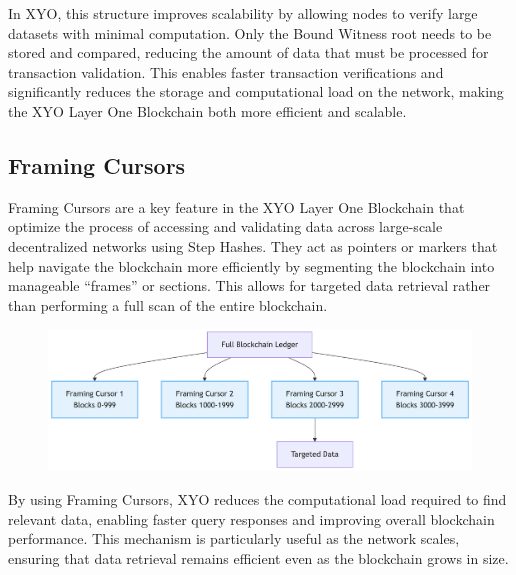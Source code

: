 \documentclass{article}
\begin{document}
In XYO, this structure improves scalability by allowing nodes to verify large datasets with minimal computation. Only the Bound Witness root needs to be stored and compared, reducing the amount of data that must be processed for transaction validation. This enables faster transaction verifications and significantly reduces the storage and computational load on the network, making the XYO Layer One Blockchain both more efficient and scalable.

\subsection{Framing Cursors}
Framing Cursors are a key feature in the XYO Layer One Blockchain that optimize the process of accessing and validating data across large-scale decentralized networks using Step Hashes. They act as pointers or markers that help navigate the blockchain more efficiently by segmenting the blockchain into manageable “frames” or sections. This allows for targeted data retrieval rather than performing a full scan of the entire blockchain. 


\begin{figure}[h]
    \centering
    \includegraphics[width=15cm]{framing-cursor.png}
\end{figure}

By using Framing Cursors, XYO reduces the computational load required to find relevant data, enabling faster query responses and improving overall blockchain performance. This mechanism is particularly useful as the network scales, ensuring that data retrieval remains efficient even as the blockchain grows in size. 
\end{document}
